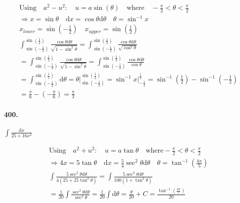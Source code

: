     \begin{mdframed}
        \begin{equation*}
            \begin{gathered}
                \text{Using} \quad a^2 - u^2: \quad u = a\sin(\theta) \quad \text{where} \quad -\frac{\pi}{2} < \theta < \frac{\pi}{2}  \\
                \Rightarrow x = \sin\theta \quad \mathrm{d}x = \cos\theta\mathrm{d}\theta \quad \theta = \sin^{-1}x \\
                x_{lower} = \sin\left(-\frac{1}{2}\right) \quad x_{upper} = \sin\left(\frac{1}{2}\right)  \\
                \int_{\sin\left(-\frac{1}{2}\right)}^{\sin\left(\frac{1}{2}\right)}\frac{\cos\theta\mathrm{d}\theta}{\sqrt{1-\sin^2\theta}} = \int_{\sin\left(-\frac{1}{2}\right)}^{\sin\left(\frac{1}{2}\right)}\frac{\cos\theta\mathrm{d}\theta}{\sqrt{\cos^2\theta}}   \\
                = \int_{\sin\left(-\frac{1}{2}\right)}^{\sin\left(\frac{1}{2}\right)}\frac{\cos\theta\mathrm{d}\theta}{\sqrt{1-\sin^2\theta}} = \int_{\sin\left(-\frac{1}{2}\right)}^{\sin\left(\frac{1}{2}\right)}\frac{\cos\theta\mathrm{d}\theta}{\cos\theta}    \\
                = \int_{\sin\left(-\frac{1}{2}\right)}^{\sin\left(\frac{1}{2}\right)}\mathrm{d}\theta = \theta\Big|_{\sin\left(-\frac{1}{2}\right)}^{\sin\left(\frac{1}{2}\right)} = \sin^{-1}x\Big|_{-\frac{1}{2}}^{\frac{1}{2}} = \sin^{-1}\left(\frac{1}{2}\right) - \sin^{-1}\left(-\frac{1}{2}\right)  \\
                = \frac{\pi}{6} - (-\frac{\pi}{6}) = \boxed{\frac{\pi}{3}}
            \end{gathered}
        \end{equation*}
    \end{mdframed}

    \paragraph*{400.}
    $\int\frac{\mathrm{d}x}{25+16x^2}$

    \begin{mdframed}
        \begin{equation*}
            \begin{gathered}
                \text{Using} \quad a^2 + u^2: \quad u=a\tan\theta \quad \text{where} -\frac{\pi}{2} < \theta < \frac{\pi}{2} \\
                \Rightarrow 4x = 5\tan\theta \quad \mathrm{d}x = \frac{5}{4}\sec^2\theta\mathrm{d}\theta \quad \theta = \tan^{-1}\left(\frac{4x}{5}\right) \\
                \int \frac{5\sec^2\theta\mathrm{d}\theta}{4(25+25\tan^2\theta)} = \int \frac{5\sec^2\theta\mathrm{d}\theta}{100(1+\tan^2\theta)}    \\
                = \frac{1}{20}\int\frac{\sec^2\theta\mathrm{d}\theta}{\sec^2\theta} = \frac{1}{20}\int\mathrm{d}\theta = \frac{\theta}{20} + C = \boxed{\frac{\tan^{-1}\left(\frac{4x}{5}\right)}{20}}
            \end{gathered}
        \end{equation*}
    \end{mdframed}


